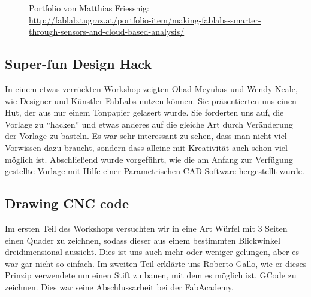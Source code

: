 \documentclass{\basedir/fablab-document}
\begin{document}
\begin{figure}[h]
	\noindent{}
	\caption{Portfolio von Matthias Friessnig:\\
	\url{http://fablab.tugraz.at/portfolio-item/making-fablabs-smarter-through-sensors-and-cloud-based-analysis/}}
	\label{sensors}
\end{figure}

\subsection*{Super-fun Design Hack}\label{super-fun-design-hack}

In einem etwas verrückten Workshop zeigten Ohad Meyuhas und Wendy Neale,
wie Designer und Künstler FabLabs nutzen können. Sie präsentierten
uns einen Hut, der aus nur einem Tonpapier gelasert wurde. Sie forderten
uns auf, die Vorlage zu \enquote{hacken} und etwas anderes auf die gleiche Art
durch Veränderung der Vorlage zu basteln. Es war sehr interessant zu
sehen, dass man nicht viel Vorwissen dazu braucht, sondern dass alleine
mit Kreativität auch schon viel möglich ist. Abschließend wurde
vorgeführt, wie die am Anfang zur Verfügung gestellte Vorlage mit Hilfe
einer Parametrischen CAD Software hergestellt wurde.

\subsection*{Drawing CNC code}\label{drawing-cnc-code}

Im ersten Teil des Workshops versuchten wir in eine Art Würfel mit 3
Seiten einen Quader zu zeichnen, sodass dieser aus einem
bestimmten Blickwinkel dreidimensional aussieht. Dies ist uns auch mehr
oder weniger gelungen, aber es war gar nicht so einfach. Im zweiten Teil
erklärte uns Roberto Gallo, wie er dieses Prinzip verwendete um einen
Stift zu bauen, mit dem es möglich ist, GCode zu zeichnen. Dies war
seine Abschlussarbeit bei der FabAcademy.
\end{document}
